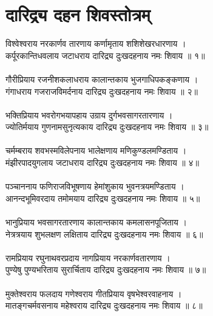 \section{\sanskrit दारिद्र्य दहन शिवस्तोत्रम् }
\sanskrit
विश्वेश्वराय नरकार्णव तारणाय कर्णामृताय शशिशेखरधारणाय ।\\ 
कर्पूरकान्तिधवलाय जटाधराय दारिद्र्य दुःखदहनाय नमः शिवाय ॥ १॥\\ 
\\
गौरीप्रियाय रजनीशकलाधराय कालान्तकाय भुजगाधिपकङ्कणाय । \\
गंगाधराय गजराजविमर्दनाय दारिद्र्य दुःखदहनाय नमः शिवाय ॥ २॥ \\
\\
भक्तिप्रियाय भवरोगभयापहाय उग्राय दुर्गभवसागरतारणाय । \\
ज्योतिर्मयाय गुणनामसुनृत्यकाय दारिद्र्य दुःखदहनाय नमः शिवाय ॥ ३॥\\ 
\\
चर्मम्बराय शवभस्मविलेपनाय भालेक्षणाय मणिकुण्डलमण्डिताय । \\
मंझीरपादयुगलाय जटाधराय दारिद्र्य दुःखदहनाय नमः शिवाय ॥ ४॥ \\
\\
पञ्चाननाय फणिराजविभूषणाय हेमांशुकाय भुवनत्रयमण्डिताय । \\
आनन्दभूमिवरदाय तमोमयाय दारिद्र्य दुःखदहनाय नमः शिवाय ॥ ५॥\\ 
\\
भानुप्रियाय भवसागरतारणाय कालान्तकाय कमलासनपूजिताय । \\
नेत्रत्रयाय शुभलक्षण लक्षिताय दारिद्र्य दुःखदहनाय नमः शिवाय ॥ ६॥ \\
\\
रामप्रियाय रघुनाथवरप्रदाय नागप्रियाय नरकार्णवतारणाय । \\
पुण्येषु पुण्यभरिताय सुरार्चिताय दारिद्र्य दुःखदहनाय नमः शिवाय ॥ ७॥\\ 
\\
मुक्तेश्वराय फलदाय गणेश्वराय गीतप्रियाय वृषभेश्वरवाहनाय । \\
मातङ्गचर्मवसनाय महेश्वराय दारिद्र्य दुःखदहनाय नमः शिवाय ॥ ८॥\\



